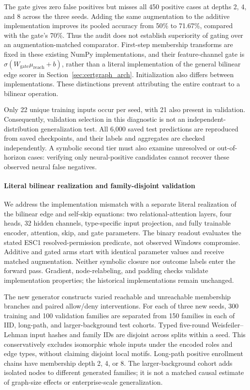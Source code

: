 

The gate gives zero false positives but misses all 450 positive cases at depths 2, 4, and 8 across the three seeds. Adding the same augmentation to the additive implementation improves its pooled accuracy from 50\% to 71.67\%, compared with the gate's 70\%. Thus the audit does not establish superiority of gating over an augmentation-matched comparator. First-step membership transforms are fixed in these existing NumPy implementations, and their feature-channel gate is $\sigma(W_{\mathrm{gate}}\mu_{\mathrm{reach}}+b)$, rather than a literal implementation of the general bilinear edge scorer in Section~\ref{sec:certgraph_arch}. Initialization also differs between implementations. These distinctions prevent attributing the entire contrast to a bilinear operation.

Only 22 unique training inputs occur per seed, with 21 also present in validation. Consequently, validation selection in this diagnostic is not an independent-distribution generalization test. All 6,000 saved test predictions are reproduced from saved checkpoints, and their labels and aggregates are checked independently. A symbolic second tier must also examine unresolved or out-of-horizon cases: verifying only neural-positive candidates cannot recover these observed neural false negatives.

\paragraph{Literal bilinear realization and family-disjoint validation}
We address the implementation mismatch with a separate literal realization of the bilinear edge and self-skip equations: two relational-attention layers, four heads, 32 hidden channels, type-specific input projection, and fully trainable encoder, attention, skip, and gate parameters. The binary readout evaluates the stated ESC1 resolved-permission predicate, not observed Windows compromise. Additive and gated arms start with identical parameter values and receive matched augmentation. Neither symbolic closure nor outcome labels enter the forward pass. Gradient, node-relabeling, and padding checks validate implementation properties; the historical implementations remain unchanged.

The new generator constructs varied reachable and unreachable membership branches and paired allow/deny interventions. For each of three new seeds, 300 training and 100 validation families are separated from 150 families in each of IID, long-path, and larger-background test cohorts. Typed five-round Weisfeiler--Lehman input hashes and family IDs are disjoint across splits within a seed. This conservatively excludes isomorphic whole inputs under the encoded roles and edge types, without claiming disjoint local motifs. Long-path positive enrollment chains have membership depth 2, 4, or 8. The larger-background cohort adds isolated nodes to different generated families; it is not a matched causal estimate of graph-size effects or enterprise-scale generalization.

